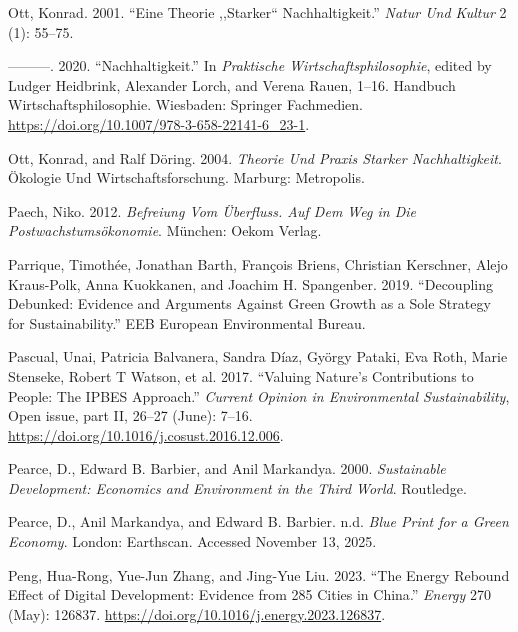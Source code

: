 \documentclass[
  a4paper,
  openany]{book}
\newlength{\cslhangindent}
\newenvironment{CSLReferences}[2] %
 {\begin{list}{}{%
  \setlength{\itemindent}{0pt}
  \setlength{\leftmargin}{0pt}
  \setlength{\parsep}{0pt}
  \ifodd #1
   \setlength{\leftmargin}{\cslhangindent}
   \setlength{\itemindent}{-1\cslhangindent}
  \fi
  \setlength{\itemsep}{#2\baselineskip}}}
 {\end{list}}
\begin{document}
\begin{CSLReferences}{1}{0}
Ott, Konrad. 2001. {``Eine {Theorie} ,,Starker`` {Nachhaltigkeit}.''}
\emph{Natur Und Kultur} 2 (1): 55--75.

---------. 2020. {``{Nachhaltigkeit}.''} In \emph{{Praktische
Wirtschaftsphilosophie}}, edited by Ludger Heidbrink, Alexander Lorch,
and Verena Rauen, 1--16. {Handbuch Wirtschaftsphilosophie}. Wiesbaden:
Springer Fachmedien.
\url{https://doi.org/10.1007/978-3-658-22141-6_23-1}.

Ott, Konrad, and Ralf Döring. 2004. \emph{Theorie Und {Praxis} Starker
{Nachhaltigkeit}}. {Ö}kologie Und {Wirtschaftsforschung}. Marburg:
Metropolis.

Paech, Niko. 2012. \emph{Befreiung Vom {{Ü}berfluss}. {Auf} Dem {Weg} in
Die {Postwachstums{ö}konomie}}. M{ü}nchen: Oekom Verlag.

Parrique, Timothée, Jonathan Barth, François Briens, Christian
Kerschner, Alejo Kraus-Polk, Anna Kuokkanen, and Joachim H. Spangenber.
2019. {``Decoupling Debunked: {Evidence} and Arguments Against Green
Growth as a Sole Strategy for Sustainability.''} EEB European
Environmental Bureau.

Pascual, Unai, Patricia Balvanera, Sandra Díaz, György Pataki, Eva Roth,
Marie Stenseke, Robert T Watson, et al. 2017. {``Valuing Nature's
Contributions to People: The {IPBES} Approach.''} \emph{Current Opinion
in Environmental Sustainability}, Open issue, part {II}, 26--27 (June):
7--16. \url{https://doi.org/10.1016/j.cosust.2016.12.006}.

Pearce, D., Edward B. Barbier, and Anil Markandya. 2000.
\emph{Sustainable {Development}: {Economics} and {Environment} in the
{Third World}}. Routledge.

Pearce, D., Anil Markandya, and Edward B. Barbier. n.d. \emph{Blue
{Print} for a {Green Economy}}. London: Earthscan. Accessed November 13,
2025.

Peng, Hua-Rong, Yue-Jun Zhang, and Jing-Yue Liu. 2023. {``The Energy
Rebound Effect of Digital Development: {Evidence} from 285 Cities in
{China}.''} \emph{Energy} 270 (May): 126837.
\url{https://doi.org/10.1016/j.energy.2023.126837}.


\end{CSLReferences}
\end{document}
